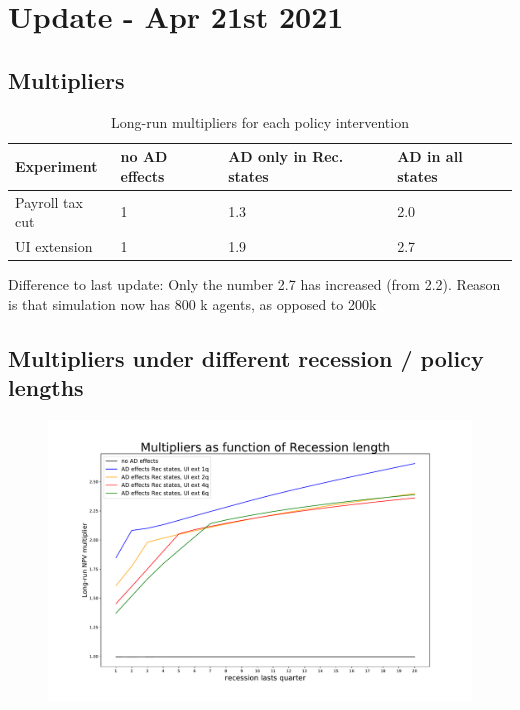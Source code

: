 \documentclass[]{article}
\begin{document}
	
\section{Update - Apr 21st 2021}

\subsection{Multipliers}
\begin{table}[htb]
	\centering
	\begin{tabular}{@{}llll@{}}
		\toprule
		Experiment  	& no AD effects & AD only in Rec. states 	& AD in all states \\ \midrule
		Payroll tax cut & 1 			& 1.3   			& 2.0  \\
		UI extension    & 1 			& 1.9 				& 2.7     \\ \bottomrule
	\end{tabular}	
	\caption{Long-run multipliers for each policy intervention }
\end{table}
	
Difference to last update: Only the number 2.7 has increased (from 2.2). Reason is that simulation now has 800 k agents, as opposed to 200k


\FloatBarrier
\subsection{Multipliers under different recession / policy lengths}
\begin{figure}[h]
	\centering
	\includegraphics[width=1\linewidth]{../FullRun_Apr18_AD05_AllStates_800k/Multipliers_RecLength_PolicyLength1}
	\caption{}
	\label{fig:multipliersreclengthpolicylength1}
\end{figure}
\end{document}
